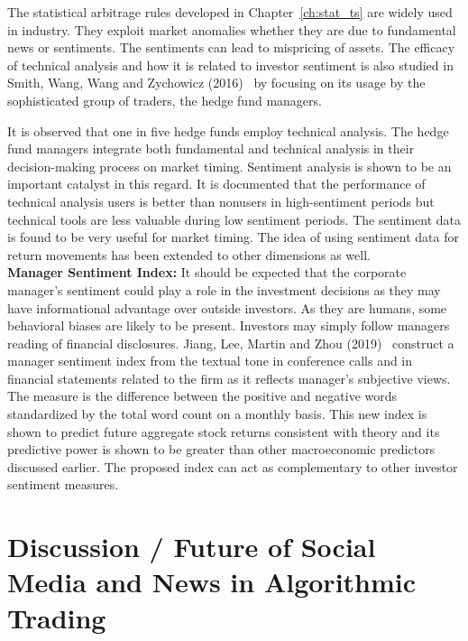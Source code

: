 The statistical arbitrage rules developed in Chapter~\ref{ch:stat_ts} are widely used in industry. They exploit market anomalies whether they are due to fundamental news or sentiments. The sentiments can lead to mispricing of assets. The efficacy of technical analysis and how it is related to investor sentiment is also studied in Smith, Wang, Wang and Zychowicz (2016)~\cite{smithwangwangzy16} by focusing on its usage by the sophisticated group of traders, the hedge fund managers. 


It is observed that one in five hedge funds employ technical analysis. The hedge fund managers integrate both fundamental and technical analysis in their decision-making process on market timing. Sentiment analysis is shown to be an important catalyst in this regard. It is documented that the performance of technical analysis users is better than nonusers in high-sentiment periods but technical tools are less valuable during low sentiment periods. The sentiment data is found to be very useful for market timing. The idea of using sentiment data for return movements has been extended to other dimensions as well. \\


\noindent\textbf{Manager Sentiment Index:} It should be expected that the corporate manager's sentiment could play a role in the investment decisions as they may have informational advantage over outside investors. As they are humans, some behavioral biases are likely to be present. Investors may simply follow managers reading of financial disclosures. Jiang, Lee, Martin and Zhou (2019)~\cite{jianleemartin} construct a manager sentiment index from the textual tone in conference calls and in financial statements related to the firm as it reflects manager's subjective views. The measure is the difference between the positive and negative words standardized by the total word count on a monthly basis. This new index is shown to predict future aggregate stock returns consistent with theory and its predictive power is shown to be greater than other macroeconomic predictors discussed earlier. The proposed index can act as complementary to other investor sentiment measures. 



\section{Discussion / Future of Social Media and News in Algorithmic Trading}

